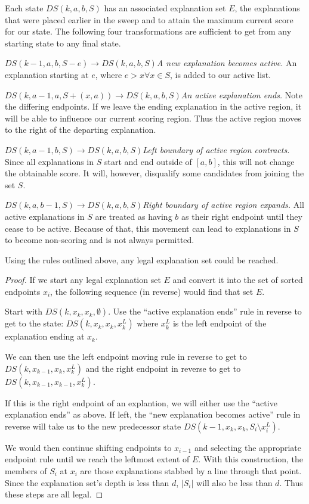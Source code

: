 Each state $DS(k,a,b,S)$ has an associated explanation set $E$, the explanations that were placed earlier in the sweep and to attain the maximum current score for our state.  The following four transformations are sufficient to get from any starting state to any final state.

$ DS(k-1,a,b,S-e) \rightarrow DS(k,a,b,S)${\it A new explanation becomes active.} An explanation starting at $e$, where $e > x \forall x \in S$, is added to our active list.

$ DS(k,a-1,a,S + (x,a)) \rightarrow DS(k,a,b,S)${\it An active explanation ends.}  Note the differing endpoints.  If we leave the ending explanation in the active region, it will be able to influence our current scoring region. Thus the active region moves to the right of the departing explanation.

$DS(k,a-1,b,S) \rightarrow DS(k, a, b, S )${\it Left boundary of active region contracts.} Since all explanations in $S$ start and end outside of $[a,b]$, this will not change the obtainable score.  It will, however, disqualify some candidates from joining the set $S$.

$DS(k,a,b-1,S) \rightarrow DS(k, a, b, S )${\it Right boundary of active region expands.} All active explanations in $S$ are treated as having $b$ as their right endpoint until they cease to be active.  Because of that, this movement can lead to explanations in $S$ to become non-scoring and is not always permitted.

\begin{lem} \label{lem:dpCorrect}
Using the rules outlined above, any legal explanation set could be reached.
\end{lem}

\begin{proof}
If we start any legal explanation set $E$ and convert it into the set of sorted endpoints $x_i$, the following sequence (in reverse) would find that set $E$.  

Start with $DS(k,x_k,x_k,\emptyset)$.  Use the ``active explanation ends'' rule  in reverse to get to the state: $DS(k,x_k,x_k,{x^L_k})$ where $x^L_k$ is the left endpoint of the explanation ending at $x_k$.

We can then use the left endpoint moving rule in reverse to get to $DS(k,x_{k-1},x_k,{x^L_k})$ and the right endpoint in reverse to get to $DS(k,x_{k-1},x_{k-1},{x^L_k})$.

If this is the right endpoint of an explantion, we will either use the ``active explanation ends'' as above.  If left, the ``new explanation becomes active'' rule in reverse will take us to the new predecessor state $DS(k-1,x_k,x_k,S_i \setminus{x^L_i} )$.

We would then continue shifting endpoints to $x_{i-1}$ and selecting the appropriate endpoint rule until we reach the leftmost extent of $E$.  With this construction, the members of $S_i$ at $x_i$ are those explanations stabbed by a line through that point.  Since the explanation set's depth is less than $d$, $|S_i|$ will also be less than $d$.  Thus these steps are all legal.
\end{proof}

